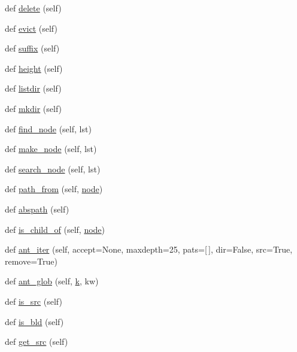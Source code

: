 \begin{DoxyCompactItemize}
def \hyperlink{classwaflib_1_1_node_1_1_node_a5b15f6a29b5158a010fc78e7d2a4eef8}{delete} (self)
\item 
def \hyperlink{classwaflib_1_1_node_1_1_node_a31ebb3fd3aee8086605111ce83122453}{evict} (self)
\item 
def \hyperlink{classwaflib_1_1_node_1_1_node_a08a86be308b4ea7e209571274504852a}{suffix} (self)
\item 
def \hyperlink{classwaflib_1_1_node_1_1_node_a6f41a0f58447b1e67c4e4826e718f853}{height} (self)
\item 
def \hyperlink{classwaflib_1_1_node_1_1_node_a70c5530ee0dc91ddd80178d039c04d94}{listdir} (self)
\item 
def \hyperlink{classwaflib_1_1_node_1_1_node_a93340e13646660f3835b0c11e133bb64}{mkdir} (self)
\item 
def \hyperlink{classwaflib_1_1_node_1_1_node_a9ab508cb5f7d7069e8575d4d660c8379}{find\+\_\+node} (self, lst)
\item 
def \hyperlink{classwaflib_1_1_node_1_1_node_a347043d52fc2dee925ef027973e01134}{make\+\_\+node} (self, lst)
\item 
def \hyperlink{classwaflib_1_1_node_1_1_node_a67385f1721014aa606e2d7b25687a40f}{search\+\_\+node} (self, lst)
\item 
def \hyperlink{classwaflib_1_1_node_1_1_node_a2994cfc8043e1f27b8873e340a885788}{path\+\_\+from} (self, \hyperlink{structnode}{node})
\item 
def \hyperlink{classwaflib_1_1_node_1_1_node_aa0164267912895aeb986fdbfcf945159}{abspath} (self)
\item 
def \hyperlink{classwaflib_1_1_node_1_1_node_abc781098e2dcdd15feea5901ea2e23af}{is\+\_\+child\+\_\+of} (self, \hyperlink{structnode}{node})
\item 
def \hyperlink{classwaflib_1_1_node_1_1_node_a06da7a2c94996ada3d100721b5cf831e}{ant\+\_\+iter} (self, accept=None, maxdepth=25, pats=\mbox{[}$\,$\mbox{]}, dir=False, src=True, remove=True)
\item 
def \hyperlink{classwaflib_1_1_node_1_1_node_a5d9b6cac9100b15869f68df28f1d8cb4}{ant\+\_\+glob} (self, \hyperlink{rfft2d_test_m_l_8m_adc468c70fb574ebd07287b38d0d0676d}{k}, kw)
\item 
def \hyperlink{classwaflib_1_1_node_1_1_node_ae47c79cf11fd975ccd2a7316eda8b892}{is\+\_\+src} (self)
\item 
def \hyperlink{classwaflib_1_1_node_1_1_node_ac800b56240d593327ff3f3f17c58313d}{is\+\_\+bld} (self)
\item 
def \hyperlink{classwaflib_1_1_node_1_1_node_a7f7ca00eb49c81382a69e032b5229ea6}{get\+\_\+src} (self)

\end{DoxyCompactItemize}
